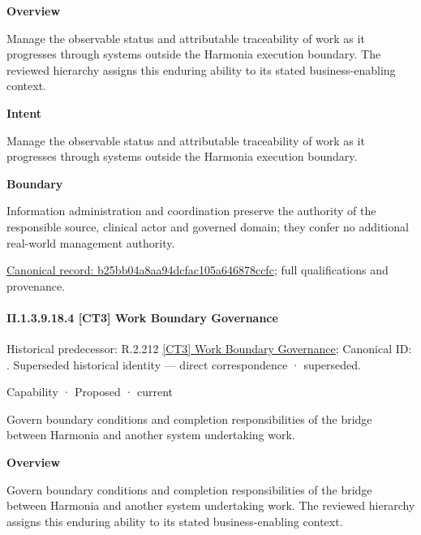 \textbf{Overview}



Manage the observable status and attributable traceability of work as it progresses through systems outside the Harmonia execution boundary. The reviewed hierarchy assigns this enduring ability to its stated business-enabling context.



\textbf{Intent}



Manage the observable status and attributable traceability of work as it progresses through systems outside the Harmonia execution boundary.



\textbf{Boundary}



Information administration and coordination preserve the authority of the responsible source, clinical actor and governed domain; they confer no additional real-world management authority.


{\footnotesize \href{../../../../continuum/strategy/capability/b25bb04a8aa94dcfac105a646878ccfc.md}{Canonical record: b25bb04a8aa94dcfac105a646878ccfc}; full qualifications and provenance.}\par
\paragraph*{II.1.3.9.18.4 [CT3] Work Boundary Governance}
\label{navigation:II.1.3.9.18.4}

{\small Historical predecessor: R.2.212 \hyperref[element:b4d14abf930a4230a7f5b93e9ce3df91]{[CT3] Work Boundary Governance}; Canonical ID: \texttt{}. Superseded historical identity — direct correspondence · superseded.}\par
\label{element:35b66a0b38db4568849ecb842ffdcbf3}
{\small Capability · Proposed · current}\par

Govern boundary conditions and completion responsibilities of the bridge between Harmonia and another system undertaking work.



\textbf{Overview}



Govern boundary conditions and completion responsibilities of the bridge between Harmonia and another system undertaking work. The reviewed hierarchy assigns this enduring ability to its stated business-enabling context.



